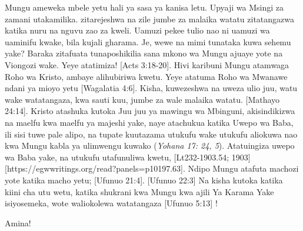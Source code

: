 Mungu ameweka mbele yetu hali ya sasa ya kanisa letu. Upyaji wa Msingi za zamani utakamilika.  zitarejeshwa na zile jumbe za malaika watatu zitatangazwa katika nuru na nguvu zao za kweli. Uamuzi pekee tulio nao ni uamuzi wa uaminifu kwake, bila kujali gharama. Je, wewe na mimi tunataka kuwa sehemu yake? Baraka zitafuata tunaposhikilia sana mkono wa Mungu ajuaye yote na Viongozi wake.  Yeye atatimiza! [Acts 3:18-20]. Hivi karibuni Mungu atamwaga Roho wa Kristo, ambaye alihubiriwa kwetu. Yeye atatuma Roho wa Mwanawe ndani ya mioyo yetu [Wagalatia 4:6]. Kisha, kuwezeshwa na uweza ulio juu, watu wake watatangaza, kwa sauti kuu, jumbe za wale malaika watatu. [Mathayo 24:14]. Kristo atashuka kutoka Juu juu ya mawingu wa Mbinguni, akisindikizwa na maelfu kwa maelfu ya majeshi yake, naye atachukua katika Uwepo wa Baba, ili sisi tuwe pale alipo, na tupate kuutazama utukufu wake utukufu aliokuwa nao kwa Mungu kabla ya ulimwengu kuwako (\textit{Yohana 17: 24, 5}). Atatuingiza uwepo wa Baba yake, na utukufu utafunuliwa kwetu, [Lt232-1903.54; 1903][https://egwwritings.org/read?panels=p10197.63]. Ndipo Mungu atafuta machozi yote katika macho yetu; [Ufunuo 21:4]. [Ufunuo 22:3] Na kisha kutoka katika kiini cha utu wetu, katika shukrani kwa Mungu kwa ajili Ya Karama Yake isiyosemeka, wote waliokolewa  watatangaza [Ufunuo 5:13]
!

Amina!


